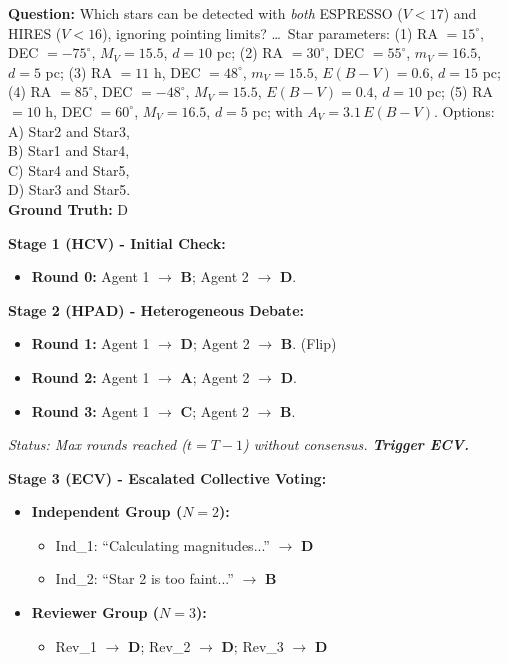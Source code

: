 \documentclass[11pt]{article}
\begin{document}
\begin{tcolorbox}[
    enhanced, breakable, width=\linewidth,
    colback=red!5, colframe=red!40!black, %
    title=\textbf{Case 3: Escalated Arbitration (Hard Task) - GPQA ID 109},
    fonttitle=\bfseries\small
]
\textbf{Question:}
Which stars can be detected with \emph{both} ESPRESSO ($V<17$) and HIRES ($V<16$),
ignoring pointing limits? \dots\ 
Star parameters:
(1) RA $=15^\circ$, DEC $=-75^\circ$, $M_V=15.5$, $d=10$ pc;
(2) RA $=30^\circ$, DEC $=55^\circ$, $m_V=16.5$, $d=5$ pc;
(3) RA $=11$ h, DEC $=48^\circ$, $m_V=15.5$, $E(B\!-\!V)=0.6$, $d=15$ pc;
(4) RA $=85^\circ$, DEC $=-48^\circ$, $M_V=15.5$, $E(B\!-\!V)=0.4$, $d=10$ pc;
(5) RA $=10$ h, DEC $=60^\circ$, $M_V=16.5$, $d=5$ pc;
with $A_V=3.1\,E(B\!-\!V)$.
Options:\\
A) Star2 and Star3,\\
B) Star1 and Star4,\\
C) Star4 and Star5,\\ 
D) Star3 and Star5.\\
\textbf{Ground Truth:} D

\vspace{4pt}
\textbf{Stage 1 (HCV) - Initial Check:}
\begin{itemize}[leftmargin=1.5em, nosep]
    \item \textbf{Round 0:} Agent 1 $\to$ \textbf{B}; Agent 2 $\to$ \textbf{D}.
\end{itemize}

\vspace{4pt}
\textbf{Stage 2 (HPAD) - Heterogeneous Debate:}
\begin{itemize}[leftmargin=1.5em, nosep]
    \item \textbf{Round 1:} Agent 1 $\to$ \textbf{D}; Agent 2 $\to$ \textbf{B}. (Flip)
    \item \textbf{Round 2:} Agent 1 $\to$ \textbf{A}; Agent 2 $\to$ \textbf{D}. 
    \item \textbf{Round 3:} Agent 1 $\to$ \textbf{C}; Agent 2 $\to$ \textbf{B}.
\end{itemize}
\textit{Status: Max rounds reached ($t=T-1$) without consensus. \textbf{Trigger ECV.}}

\vspace{4pt}
\textbf{Stage 3 (ECV) - Escalated Collective Voting:}
\begin{itemize}[leftmargin=1.5em, nosep]
    \item \textbf{Independent Group ($N=2$):}
    \begin{itemize}[nosep]
        \item Ind\_1: ``Calculating magnitudes...'' $\to$ \textbf{D}
        \item Ind\_2: ``Star 2 is too faint...'' $\to$ \textbf{B}
    \end{itemize}
    \item \textbf{Reviewer Group ($N=3$):}
    \begin{itemize}[nosep]
        \item Rev\_1 $\to$ \textbf{D}; Rev\_2 $\to$ \textbf{D}; Rev\_3 $\to$ \textbf{D}
    \end{itemize}
\end{itemize}


\end{tcolorbox}
\end{document}
